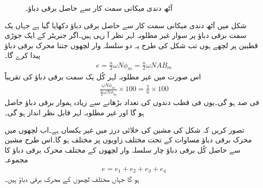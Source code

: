 \begin{figure}
\centering
\caption{آٹھ دندی میکانی سمت کار سے حاصل برقی دباؤ۔}
\label{شکل_یکسمتی-آٹھ_دندوں_سمتکار_کی_لہر}
\end{figure}

شکل   میں آٹھ دندی میکانی سمت کار سے حاصل برقی دباؤ دکھایا گیا ہے جہاں  یک سمت  برقی دباؤ پر سوار غیر مطلوبہ  لہر نظر آ رہی ہیں۔اگر جنریٹر  کے ایک جوڑی قطبین پر  لچھے ہوں تب شکل   کی طرح یہ دو   سلسلہ وار لچھوں جتنا محرک برقی دباؤ پیدا کرے گا۔
\begin{align}\label{مساوات_یکسمتی_پیدا_دباو_الف}
e=\frac{n}{2} \omega N \phi_m=\frac{n}{2} \omega N A B_m
\end{align}
اس صورت میں  غیر مطلوبہ لہر کُل یک سمت  برقی دباؤ کی تقریباً
\begin{align}\label{مساوات_یکسمتی_فی_صد_لہر}
\frac{\omega N \phi_m}{\frac{n}{2} \omega N \phi_m} \times 100=\frac{2}{n} \times 100
\end{align}
فی صد ہو گی۔یوں فی قطب دندوں کی تعداد بڑھانے سے زیادہ ہموار برقی دباؤ حاصل ہو گا اور غیر مطلوبہ لہر قابل نظر انداز ہو گی۔

تصور کریں کہ شکل   کی مشین کی خلائی درز میں  غیر  یکساں  ہے۔اب لچھوں میں محرک برقی دباؤ مساوات   کے تحت مختلف زاویوں پر مختلف ہو گا۔اس طرح مشین سے حاصل کُل برقی دباؤ چار سلسلہ وار لچھوں کے مختلف محرک برقی دباؤ کا مجموعہ 
\begin{align} \label{مساوات_یکسمتی_کل_دباو_مجموعہ}
e=e_1+e_2+e_3+e_4
\end{align}
ہو گا جہاں   مختلف لچھوں کے محرک برقی دباؤ  ہیں۔

